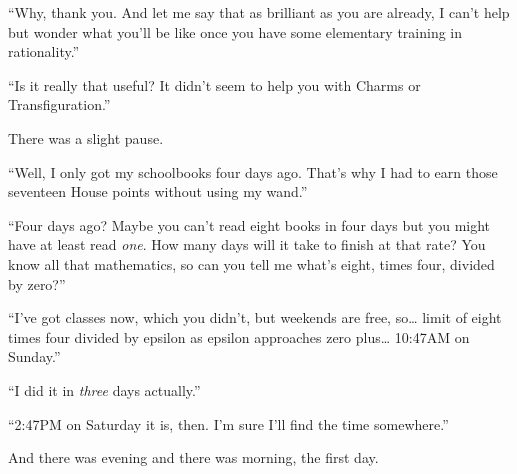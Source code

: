 ``Why, thank you. And let me say that as brilliant as you are already, I
can't help but wonder what you'll be like once you have some elementary
training in rationality.''

``Is it really that useful? It didn't seem to help you with Charms or
Transfiguration.''

There was a slight pause.

``Well, I only got my schoolbooks four days ago. That's why I had to
earn those seventeen House points without using my wand.''

``Four days ago? Maybe you can't read eight books in four days but you
might have at least read \emph{one}. How many days will it take to
finish at that rate? You know all that mathematics, so can you tell me
what's eight, times four, divided by zero?''

``I've got classes now, which you didn't, but weekends are free,
so\ldots{} limit of eight times four divided by epsilon as epsilon
approaches zero plus\ldots{} 10:47AM on Sunday.''

``I did it in \emph{three} days actually.''

``2:47PM on Saturday it is, then. I'm sure I'll find the time
somewhere.''

And there was evening and there was morning, the first day.
